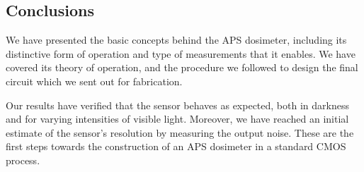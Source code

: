\subsection{Conclusions}
We have presented the basic concepts behind the APS dosimeter,
including its distinctive form of operation and type of measurements that it enables.
We have covered its theory of operation,
and the procedure we followed to design the final circuit which we sent out for fabrication.

Our results have verified that the sensor
behaves as expected, both in darkness and for varying intensities of visible light.
Moreover, we have reached an initial estimate of the sensor's resolution
by measuring the output noise.
These are the first steps towards the construction of an APS dosimeter in a standard CMOS process.
